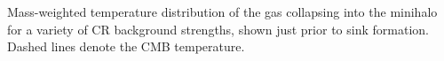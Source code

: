 Mass-weighted temperature distribution of the gas collapsing into the minihalo for a variety of CR background strengths, shown just prior to sink formation.  Dashed lines denote the CMB temperature.